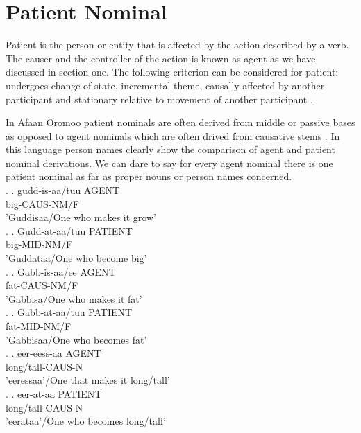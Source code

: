 \documentclass[11pt,a4paper]{article}
\begin{document}
\section{Patient Nominal}
Patient is the person or entity that is affected by the action described by a verb. The causer and the controller of the action is known as agent as we have discussed in section one. The following criterion can be considered for patient: undergoes change of state, incremental theme, causally affected by another participant and stationary relative to movement of another participant \cite{barker1993nominal}. 

In Afaan Oromoo patient nominals are often derived from middle or passive bases as opposed to agent nominals which are often drived from causative stems \cite{tolemariam2009}. In this language person names clearly show the comparison of agent and patient nominal derivations. We can dare to say for every agent nominal there is one patient nominal as far as proper nouns or person names concerned. \\

\ex.
\ag.
gudd-is-aa/tuu  AGENT\\
big-CAUS-NM/F\\
'Guddisaa/One who makes it grow'\\

\ex.
\ag.
Gudd-at-aa/tuu PATIENT\\
big-MID-NM/F\\
'Guddataa/One who become big'\\

\ex.
\ag.
Gabb-is-aa/ee AGENT\\
fat-CAUS-NM/F\\
'Gabbisa/One who makes it fat'\\

\ex.
\ag.
Gabb-at-aa/tuu PATIENT\\
fat-MID-NM/F\\
'Gabbisaa/One who becomes fat'\\


\ex.
\ag.
eer-eess-aa AGENT\\
long/tall-CAUS-N\\
'eeressaa'/One that makes it long/tall'\\

\ex.
\ag.
eer-at-aa PATIENT\\
long/tall-CAUS-N\\
'eerataa'/One who becomes long/tall'
\end{document}
